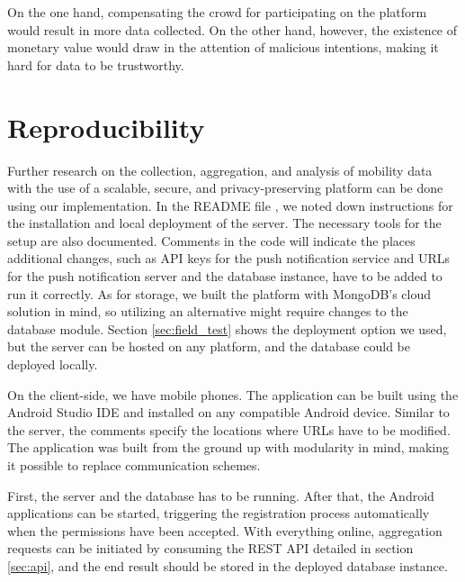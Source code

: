 On the one hand, compensating the crowd for participating on the platform would result in more data collected. On the other hand, however, the existence of monetary value would draw in the attention of malicious intentions, making it hard for data to be trustworthy.

\section{Reproducibility}
Further research on the collection, aggregation, and analysis of mobility data with the use of a scalable, secure, and privacy-preserving platform can be done using our implementation. In the README file \cite{readme}, we noted down instructions for the installation and local deployment of the server. The necessary tools for the setup are also documented. Comments in the code will indicate the places additional changes, such as API keys for the push notification service and URLs for the push notification server and the database instance, have to be added to run it correctly. As for storage, we built the platform with MongoDB's cloud solution in mind, so utilizing an alternative might require changes to the database module. Section \ref{sec:field_test} shows the deployment option we used, but the server can be hosted on any platform, and the database could be deployed locally.

On the client-side, we have mobile phones. The application can be built using the Android Studio IDE and installed on any compatible Android device. Similar to the server, the comments specify the locations where URLs have to be modified. The application was built from the ground up with modularity in mind, making it possible to replace communication schemes.

First, the server and the database has to be running. After that, the Android applications can be started, triggering the registration process automatically when the permissions have been accepted. With everything online, aggregation requests can be initiated by consuming the REST API detailed in section \ref{sec:api}, and the end result should be stored in the deployed database instance.